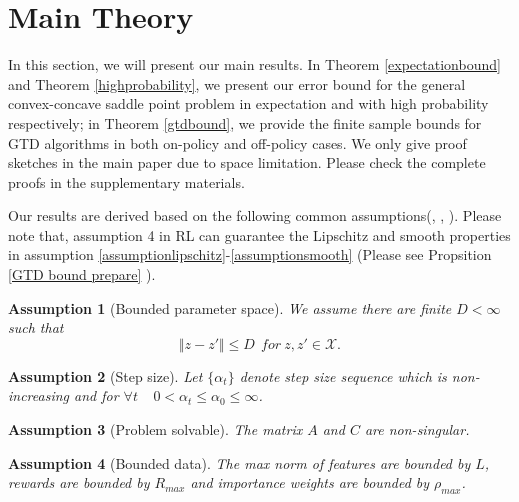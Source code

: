 \documentclass[twoside,11pt]{article}
\newtheorem{assumption}{Assumption}
\numberwithin{equation}{section}
\begin{document}
\section{Main Theory}

	
	In this section, we will present our main results. In  Theorem \ref{expectationbound} and Theorem \ref{highprobability}, we present our error bound for the general convex-concave saddle point problem  in expectation and with high probability respectively; in Theorem \ref{gtdbound}, we provide the finite sample bounds for GTD algorithms in both on-policy and off-policy cases.   We only give  proof sketches in the main paper due to space limitation. Please check the complete proofs in the supplementary materials.
	
	
	Our results are derived based on the following common assumptions(\cite{nemirovski2004prox}, \cite{duchi2012ergodic}, \cite{liu2015finite}).
	Please note that, assumption 4 in RL can guarantee the Lipschitz and smooth properties in assumption \ref{assumptionlipschitz}-\ref{assumptionsmooth} (Please see Propsition \ref{GTD bound prepare} ). 
	
	
	
				\begin{assumption}[Bounded parameter space]\label{assumptioncompactness}
					We assume there are finite  $ D< \infty $ such that	
					$$ \Vert z-z'\Vert \le D ~~for~ z,z'  \in \mathcal{X}  .$$
				\end{assumption}
				
				\begin{assumption}[Step size]\label{assumptionstepsize}
					Let $ \lbrace\alpha_t \rbrace $ denote step size sequence which is non-increasing and for  $  \forall t ~~~~~ 0<\alpha_t \le \alpha_0 \le \infty $.
				\end{assumption}
				
				\begin{assumption}[Problem solvable]\label{assrl nonsingular}
					The matrix $ A  $ and $ C $ are non-singular.
				\end{assumption}
				
				
				\begin{assumption}[Bounded data]\label{assrl bound}
					The max norm of features are bounded  by $ L $, rewards are bounded by $ R_{max} $  and importance weights are bounded by $ \rho_{max} $.
				\end{assumption}
				
\end{document}

